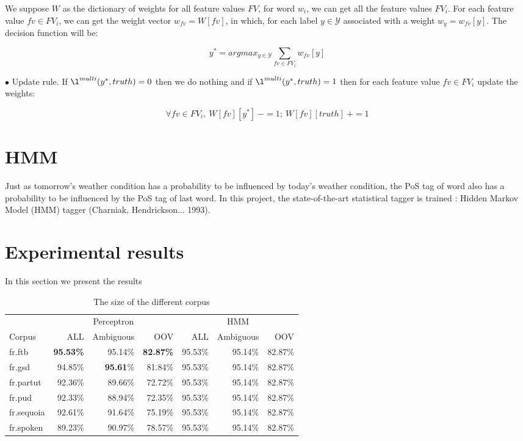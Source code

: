 \documentclass{article}
\def\YY{{\mathcal{Y}}}
\begin{document}
We suppose $W$ as the dictionary of weights for all feature values $FV$,  for word $w_i$, we can get all the feature values $FV_i$. For each feature value $fv \in FV_i$, we can get the weight vector $w_{fv} = W[fv]$, in which, for each label $y \in \YY$ associated with a weight $w_y = w_{fv} [y]$. The decision function will be:

\begin{equation}
y^* = argmax_{y \in \YY} \sum_{fv \in FV_i} {w_{fv}[y]}
\end{equation}

$\bullet$ Update rule. If $\l^{multi}(y^*, truth) = 0$ then we do nothing and if $\l^{multi}(y^*, truth) = 1$ then for each feature value $fv \in FV_i$ update the weights:

\begin{equation}
\forall fv \in FV_i,\  W[fv][y^*]\ -= 1;\ W[fv][truth]\ += 1
\end{equation} 

\section{HMM}
Just as tomorrow's weather condition has a probability to be influenced by today's weather condition, the PoS tag of word also has a probability to be influenced by the PoS tag of last word. 
In this project, the state-of-the-art statistical tagger is trained : Hidden Markov Model (HMM) tagger (Charniak, Hendrickson... 1993).
\section{Experimental results}

In this section we present the results  

\begin{table}[h]
    \caption{The size of the different corpus}
    \vspace{5pt}
    \centering
    
\begin{tabular}{|l|rrr|rrr|}
\hline
\multicolumn{1}{|c|}{\ } & \multicolumn{3}{c|}{Perceptron} & \multicolumn{3}{c|}{HMM}\\ 
\cline{2-7}
Corpus & ALL & Ambiguous & OOV & ALL & Ambiguous & OOV\\
\hline
fr.ftb     & \textbf{95.53\%} & 95.14\% & \textbf{82.87\%} & 95.53\% & 95.14\% & 82.87\% \\
fr.gsd     & 94.85\% & \textbf{95.61}\% & 81.84\% & 95.53\% & 95.14\% & 82.87\% \\
fr.partut  & 92.36\% & 89.66\% & 72.72\% & 95.53\% & 95.14\% & 82.87\% \\
fr.pud     & 92.33\% & 88.94\% & 72.35\% & 95.53\% & 95.14\% & 82.87\% \\
fr.sequoia & 92.61\% & 91.64\% & 75.19\% & 95.53\% & 95.14\% & 82.87\% \\
fr.spoken  & 89.23\% & 90.97\% & 78.57\% & 95.53\% & 95.14\% & 82.87\% \\
\hline
\end{tabular}
\end{table}

 
% 

\end{document}
